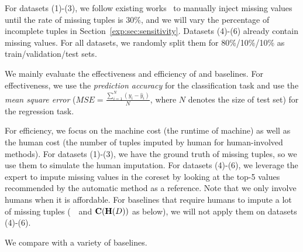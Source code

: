 
For datasets (1)-(3), we follow existing works~\cite{DBLP:journals/jbd/KhanH20,DBLP:conf/icml/YoonJS18,DBLP:conf/mlsys/WuZIR20} to manually inject missing values until the  rate of missing tuples is 30\%, and we will vary the percentage of incomplete tuples in Section~\ref{exp:sec:sensitivity}. Datasets (4)-(6) already contain missing values. For all datasets, we randomly split them for 80\%/10\%/10\% as train/validation/test sets.






We mainly evaluate the effectiveness and efficiency of \ours and  baselines. For effectiveness, we use the {\it prediction accuracy} for the classification task and use the {\it mean square error} ($MSE = \frac{\sum_{i=1}^N(y_i-\hat{y}_i)}{N}$, where $N$ denotes the size of test set) for the regression task. 

For efficiency, we focus on the machine cost (\ie the runtime of machine) as well as the human cost (the number of tuples imputed by human for human-involved methods). For datasets (1)-(3), we have the ground truth of missing tuples, so we use them to simulate the human imputation. For datasets (4)-(6), we leverage the expert to impute missing values in the coreset by looking at the top-5 values recommended by the automatic method as a reference. Note that we only involve humans when it is affordable. For baselines that require humans to impute a lot of missing tuples (\ie~\truth~and $\mathbf{C}(\mathbf{H}(D))$ as below), we will not apply them on datasets (4)-(6).

 We compare \ours with a variety of baselines.







